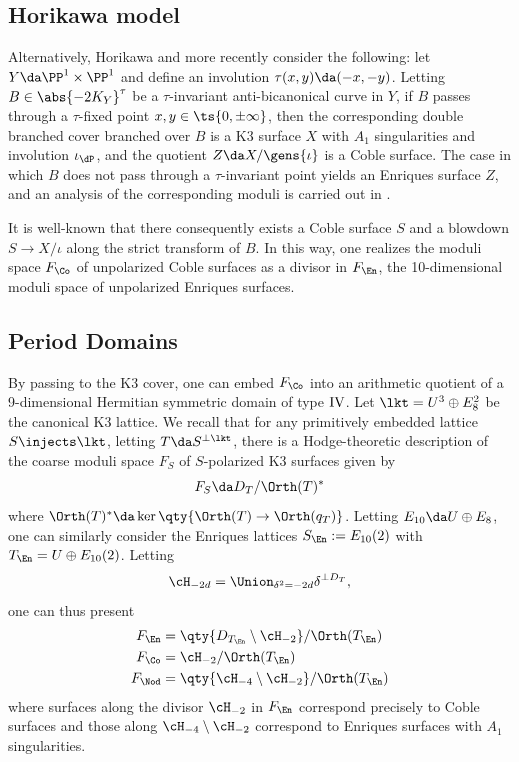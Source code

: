 \documentclass[../../main.tex]{subfiles}
\begin{document}
\subsection{Horikawa model}
\begin{remark}
Alternatively, Horikawa \cite{Hor78} and more recently \cite{AEGS23} consider the following: let $Y\da \PP^1\times \PP^1$ and define an involution $\tau(x,y) \da (-x,-y)$. Letting $B\in\abs{-2K_{Y}}^\tau$ be a $\tau$-invariant anti-bicanonical curve in $Y$, if $B$ passes through a $\tau$-fixed point $x,y\in \ts{0, \pm \infty}$, then the corresponding double branched cover branched over $B$ is a K3 surface $X$ with $A_1$ singularities and involution $\iota_{\dP}$, and the quotient $Z\da X/\gens{\iota}$ is a Coble surface. The case in which $B$ does not pass through a $\tau$-invariant point yields an Enriques surface $Z$, and an analysis of the corresponding moduli is carried out in \cite{AEGS23}.


It is well-known that there consequently exists a Coble surface $S$ and a blowdown $S\to X/\iota$ along the strict transform of $B$. In this way, one realizes the moduli space $F_{\Co}$ of unpolarized Coble surfaces as a divisor in $F_{\En}$, the 10-dimensional moduli space of unpolarized Enriques surfaces.
\end{remark}

\subsection{Period Domains}

By passing to the K3 cover, one can embed $F_\Co$ into an arithmetic quotient of a 9-dimensional Hermitian symmetric domain of type $\rm{IV}$. Let $\lkt = U^3 \oplus E_8^2$ be the canonical K3 lattice. We recall that for any primitively embedded lattice $S\injects \lkt$, letting $T \da S^{\perp \lkt}$, there is a Hodge-theoretic description of the coarse moduli space $F_S$ of $S$-polarized K3 surfaces given by
\[
F_S \da D_T/\Orth(T)^*
\]
where $\Orth(T)^* \da \ker\qty{\Orth(T) \to \Orth(q_T)}$.
Letting $E_{10} \da U \oplus E_8$, one can similarly consider the Enriques lattices $S_\En := E_{10}(2)$ with $T_\En = U \oplus E_{10}(2)$. Letting
\[
\cH_{-2d} = \Union_{\delta^2 = -2d} \delta^{\perp D_T}
,\]
one can thus present
\begin{align*}
F_{\En} &= \qty{D_{T_\En} \setminus \cH_{-2}} / \Orth(T_\En) \\
F_{\Co} &= \cH_{-2} / \Orth(T_\En) \\
F_{\Nod} &= \qty{\cH_{-4} \setminus \cH_{-2}} / \Orth(T_\En)
\end{align*}
where surfaces along the divisor $\cH_{-2}$ in $F_\En$ correspond precisely to Coble surfaces and those along $\cH_{-4}\setminus \cH_{-2}$ correspond to Enriques surfaces with $A_1$ singularities.
\end{document}
